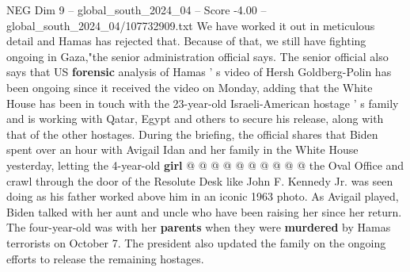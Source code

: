 \begin{textsample}{NEG Dim 9 – global\_south\_2024\_04 – Score -4.00 – global\_south\_2024\_04/107732909.txt}
We have worked it out in meticulous detail and Hamas has rejected that.
Because of that, we still have fighting ongoing in Gaza,"the senior administration official says.
The senior official also says that US \textbf{forensic} analysis of Hamas ' s video of Hersh Goldberg-Polin has been ongoing since it received the video on Monday, adding that the White House has been in touch with the 23-year-old Israeli-American hostage ' s family and is working with Qatar, Egypt and others to secure his release, along with that of the other hostages.
During the briefing, the official shares that Biden spent over an hour with Avigail Idan and her family in the White House yesterday, letting the 4-year-old \textbf{girl} @ @ @ @ @ @ @ @ @ @ the Oval Office and crawl through the door of the Resolute Desk like John F.
Kennedy Jr. was seen doing as his father worked above him in an iconic 1963 photo.
As Avigail played, Biden talked with her aunt and uncle who have been raising her since her return.
The four-year-old was with her \textbf{parents} when they were \textbf{murdered} by Hamas terrorists on October 7.
The president also updated the family on the ongoing efforts to release the remaining hostages.

\end{textsample}
